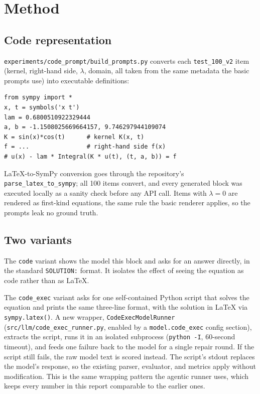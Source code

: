 \documentclass[11pt]{article}
\begin{document}
\section{Method}

\subsection{Code representation}
\texttt{experiments/code\_prompt/build\_prompts.py} converts each
\texttt{test\_100\_v2} item (kernel, right-hand side, $\lambda$, domain, all
taken from the same metadata the basic prompts use) into executable
definitions:

\begin{verbatim}
from sympy import *
x, t = symbols('x t')
lam = 0.6800510922329444
a, b = -1.1508025669664157, 9.746297944109074
K = sin(x)*cos(t)      # kernel K(x, t)
f = ...                # right-hand side f(x)
# u(x) - lam * Integral(K * u(t), (t, a, b)) = f
\end{verbatim}

LaTeX-to-SymPy conversion goes through the repository's
\texttt{parse\_latex\_to\_sympy}; all 100 items convert, and every generated
block was executed locally as a sanity check before any API call. Items with
$\lambda = 0$ are rendered as first-kind equations, the same rule the basic
renderer applies, so the prompts leak no ground truth.

\subsection{Two variants}
The \texttt{code} variant shows the model this block and asks for an answer
directly, in the standard \texttt{SOLUTION:} format. It isolates the effect of
seeing the equation as code rather than as LaTeX.

The \texttt{code\_exec} variant asks for one self-contained Python script that
solves the equation and prints the same three-line format, with the solution
in LaTeX via \texttt{sympy.latex()}. A new wrapper,
\texttt{CodeExecModelRunner} (\texttt{src/llm/code\_exec\_runner.py}, enabled
by a \texttt{model.code\_exec} config section), extracts the script, runs it
in an isolated subprocess (\texttt{python -I}, 60-second timeout), and feeds
one failure back to the model for a single repair round. If the script still
fails, the raw model text is scored instead. The script's stdout replaces the
model's response, so the existing parser, evaluator, and metrics apply without
modification. This is the same wrapping pattern the agentic runner uses, which
keeps every number in this report comparable to the earlier ones.
\end{document}
